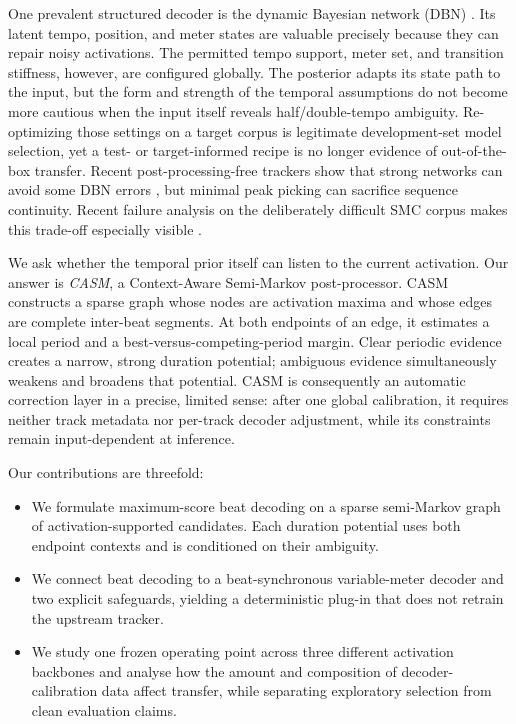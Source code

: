 \documentclass{article}
\begin{document}
One prevalent structured decoder is the dynamic Bayesian network (DBN)
\cite{krebs2015dbn}. Its latent tempo, position, and meter states are valuable
precisely because they can repair noisy activations. The permitted tempo
support, meter set, and transition stiffness, however, are configured globally.
The posterior adapts its state path to the input, but the form and strength of
the temporal assumptions do not become more cautious when the input itself
reveals half/double-tempo ambiguity. Re-optimizing those settings on a target
corpus is legitimate development-set model selection, yet a
test- or target-informed recipe is no longer evidence of out-of-the-box
transfer. Recent post-processing-free trackers show that strong networks can
avoid some DBN errors \cite{chen2022postprocessingfree,foscarin2024beat},
but minimal peak picking can sacrifice sequence continuity. Recent failure
analysis on the deliberately difficult SMC corpus makes this trade-off
especially visible \cite{ahn2026smcblindspot}.

We ask whether the temporal prior itself can listen to the current activation.
Our answer is \emph{CASM}, a Context-Aware Semi-Markov post-processor. CASM
constructs a sparse graph whose nodes are activation maxima and whose edges are
complete inter-beat segments. At both endpoints of an edge, it estimates a
local period and a best-versus-competing-period margin. Clear periodic evidence
creates a narrow, strong duration potential; ambiguous evidence simultaneously
weakens and broadens that potential. CASM is consequently an automatic
correction layer in a precise, limited sense: after one global calibration, it
requires neither track metadata nor per-track decoder adjustment, while its
constraints remain input-dependent at inference.

Our contributions are threefold:
\begin{itemize}
  \setlength\itemsep{0pt}
  \setlength\parskip{0pt}
  \item We formulate maximum-score beat decoding on a sparse semi-Markov graph
  of activation-supported candidates. Each duration potential uses both
  endpoint contexts and is conditioned on their ambiguity.
  \item We connect beat decoding to a beat-synchronous variable-meter decoder
  and two explicit safeguards, yielding a deterministic plug-in that does not
  retrain the upstream tracker.
  \item We study one frozen operating point across three different activation
  backbones and analyse how the amount and composition of decoder-calibration
  data affect transfer, while separating exploratory selection from clean
  evaluation claims.
\end{itemize}
\end{document}
